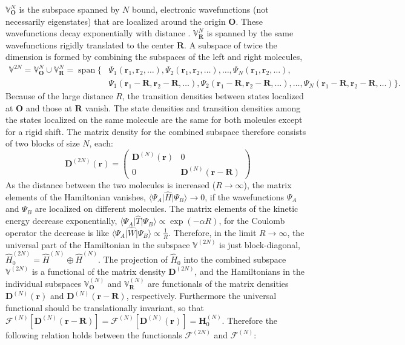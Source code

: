 \documentclass[journal=jpca,manuscript=article,layout=singlecolumn]{achemso}
\DeclareMathOperator{\Span}{span}
\newcommand\m[1]{\mathbf{#1}}
\renewcommand\vec[1]{\mathbf{#1}}
\begin{document}
$\mathbb{V}_{\vec{O}}^N$ is the subspace spanned by $N$ bound, electronic wavefunctions (not necessarily eigenstates) that are localized around the origin $\vec{O}$.
These wavefunctions decay exponentially with distance \cite{Katriel1980asymptotic}. $\mathbb{V}_{\vec{R}}^N$ is spanned by the same wavefunctions rigidly translated to the center $\vec{R}$. A subspace of twice the dimension is formed by combining the subspaces of the left and right molecules,
\begin{equation}
  \begin{split}
    \mathbb{V}^{2N} = \mathbb{V}^{N}_{\vec{O}} \cup \mathbb{V}^{N}_{\vec{R}} = \Span\Big\{ &
                  \Psi_1(\vec{r}_1,\vec{r}_2,\ldots),
                  \Psi_2(\vec{r}_1,\vec{r}_2,\ldots), \ldots,
                  \Psi_N(\vec{r}_1,\vec{r}_2,\ldots), \\
    &             \Psi_1(\vec{r}_1-\vec{R},\vec{r}_2-\vec{R},\ldots),
                  \Psi_2(\vec{r}_1-\vec{R},\vec{r}_2-\vec{R},\ldots), \ldots,
                  \Psi_N(\vec{r}_1-\vec{R},\vec{r}_2-\vec{R},\ldots) \Big\}.
  \end{split}
\end{equation}
Because of the large distance $R$, the transition densities between states localized at $\vec{O}$ and those at $\vec{R}$ vanish. The state densities and transition densities among the states localized on the same molecule are the same for both moleules except for a rigid shift. The matrix density for the combined subspace therefore consists of two blocks of size $N$, each:
\begin{equation}
  \m{D}^{(2N)}(\vec{r}) =
  \begin{pmatrix}
    \m{D}^{(N)}(\vec{r}) & 0 \\
    0 & \m{D}^{(N)}(\vec{r}-\vec{R})
  \end{pmatrix}
\end{equation}
As the distance between the two molecules is increased ($R \to \infty$), the matrix elements of the Hamiltonian vanishes, $\langle \Psi_{A} \vert \hat{H} \vert \Psi_{B} \rangle \to 0$, if the wavefunctions $\Psi_A$ and $\Psi_B$ are localized on different molecules. The matrix elements of the kinetic energy decrease exponentially, $\langle \Psi_{A} \vert \hat{T} \vert \Psi_{B} \rangle \propto \exp(-\alpha R)$, for the Coulomb operator the decrease is like $\langle \Psi_{A} \vert \hat{W} \vert \Psi_{B} \rangle \propto \frac{1}{R}$.
Therefore, in the limit $R \to \infty$, the universal part of the Hamiltonian in the subspace $\mathbb{V}^{(2 N)}$ is just block-diagonal, $\hat{H}^{(2N)}_0 = \hat{H}^{(N)} \oplus \hat{H}^{(N)}$. The projection of $\hat{H}_0$ into the combined subspace $\mathbb{V}^{(2N)}$ is a functional of the matrix density $\m{D}^{(2N)}$, and the Hamiltonians in the individual subspaces $\mathbb{V}^{(N)}_{\vec{O}}$ and $\mathbb{V}^{(N)}_{\vec{R}}$ are functionals of the matrix densities $\m{D}^{(N)}(\vec{r})$ and $\m{D}^{(N)}(\vec{r}-\vec{R})$, respectively. Furthermore the universal functional should be translationally invariant, so that $\m{\mathcal{F}}^{(N)}[\m{D}^{(N)}(\vec{r}-\vec{R})] = \m{\mathcal{F}}^{(N)}[\m{D}^{(N)}(\vec{r})] = \m{H}^{(N)}_0$. Therefore the following relation holds between the functionals $\m{\mathcal{F}}^{(2N)}$ and $\m{\mathcal{F}}^{(N)}$:
\end{document}
